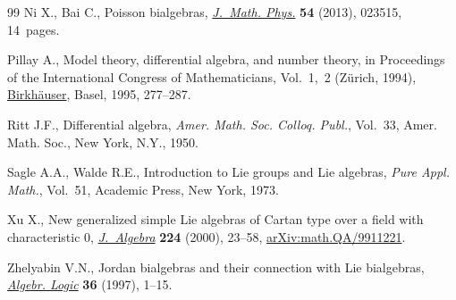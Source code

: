 \begin{thebibliography}{99}
Ni X., Bai C., Poisson bialgebras, \href{https://doi.org/10.1063/1.4792668}{\textit{J.~Math. Phys.}} \textbf{54} (2013),
 023515, 14~pages.

Pillay A., Model theory, differential algebra, and number theory, in
 Proceedings of the {I}nternational {C}ongress of {M}athematicians,
 {V}ol.~1,~2 ({Z}\"urich, 1994), \href{https://doi.org/10.1007/978-3-0348-9078-6_21}{Birkh\"auser}, Basel, 1995, 277--287.

Ritt J.F., Differential algebra, \textit{Amer. Math. Soc. Colloq. Publ.},
 Vol.~33, Amer. Math. Soc., New York, N.Y., 1950.

Sagle A.A., Walde R.E., Introduction to {L}ie groups and {L}ie algebras,
 \textit{Pure Appl. Math.}, Vol.~51, Academic Press, New York, 1973.

Xu X., New generalized simple {L}ie algebras of {C}artan type over a field with
 characteristic {$0$}, \href{https://doi.org/10.1006/jabr.1998.8083}{\textit{J.~Algebra}} \textbf{224} (2000), 23--58,
 \href{https://arxiv.org/abs/math.QA/9911221}{arXiv:math.QA/9911221}.

Zhelyabin V.N., Jordan bialgebras and their connection with {L}ie bialgebras,
 \href{https://doi.org/10.1007/BF02671949}{\textit{Algebr. Logic}} \textbf{36} (1997), 1--15.

\end{thebibliography}
